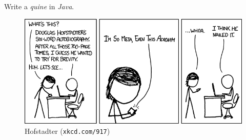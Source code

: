 

\problem Write a \textit{quine} in \textit{Java}.

\begin{figure}[h]
	\begin{center}
		\includegraphics[scale=0.5]{hofstadter.png}
	\end{center}
	\caption*{Hofstadter (\texttt{xkcd.com/917})}
	\label{fig:xkcd_hofstadter}
\end{figure}

\solution

\algorithm

\sourcecode


\varDescription
